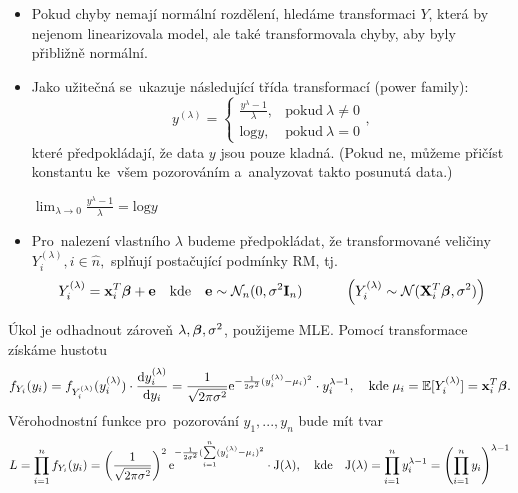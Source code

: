 \begin{itemize}
\item Pokud chyby nemají normální rozdělení, hledáme transformaci $Y$, která by nejenom linearizovala model, ale také transformovala chyby, aby byly přibližně normální.
\item Jako užitečná se~ukazuje následující třída transformací (power family):
 $$
 y^{(\lambda)} = \begin{cases}
      \frac{y^{\lambda}-1}{\lambda}, & \text{pokud}\ \lambda \neq 0 \\
      \text{log}y, & \text{pokud}\ \lambda = 0
    \end{cases},
 $$
které předpokládají, že data $y$ jsou pouze kladná. (Pokud ne, můžeme přičíst konstantu ke~všem pozorováním a~analyzovat takto posunutá data.)
\begin{remark}
 $\lim_{\lambda \rightarrow 0}  \frac{y^{\lambda}-1}{\lambda} = \text{log}y$
\end{remark}
\item Pro~nalezení vlastního $\lambda$ budeme předpokládat, že transformované veličiny \\ $Y_i^{(\lambda)}, i\in\widehat{n},$ splňují postačující podmínky RM, tj.
 $$
 Y_i^{(\lambda)} = \mathbf{x}_i^T \boldsymbol{\beta} + \mathbf{e} \quad \text{kde} \quad \mathbf{e} \sim \mathcal{N}_n (0,\sigma^2 \textbf{I}_{n}) \quad \quad \quad \left(Y_i^{(\lambda)} \sim \mathcal{N} (\mathbf{X}_i^T \boldsymbol{\beta}, \sigma^2) \right)
 $$
\end{itemize}
Úkol je odhadnout zároveň $\lambda, \boldsymbol{\beta}, \sigma^2$, použijeme MLE. Pomocí transformace získáme hustotu
 $$
  f_{Y_i}(y_i) = f_{Y_i^{(\lambda)}}(y_i^{(\lambda)}) \cdot \frac{\mathrm{d} y_i^{(\lambda)}}{\mathrm{d} y_i} = \frac{1}{\sqrt{2 \pi \sigma^2}} \mathrm{e}^{-\frac{1}{2 \sigma^2}(y_i^{(\lambda)} - \mu_i)^2} \cdot y_i^{\lambda - 1}, \quad \text{kde} \; \mu_i = \mathbb{E}[Y_i^{(\lambda)}] = \mathbf{x}_i^T \boldsymbol{\beta}.
 $$
Věrohodnostní funkce pro~pozorování $y_1,...,y_n$ bude mít tvar
 $$
  L = \prod_{i = 1}^nf_{Y_i}(y_i) = \left(\frac{1}{\sqrt{2 \pi \sigma^2}} \right)^2 \mathrm{e}^{-\frac{1}{2 \sigma^2}(\sum\limits_{i=1}^{n} (y_i^{(\lambda)} - \mu_i)^2} \cdot \mathrm{J}(\lambda), \quad \text{kde} \quad \mathrm{J}(\lambda) = \prod_{i = 1}^n y_i^{\lambda - 1} = \left(\prod_{i = 1}^n y_i \right)^{\lambda - 1}
 $$

